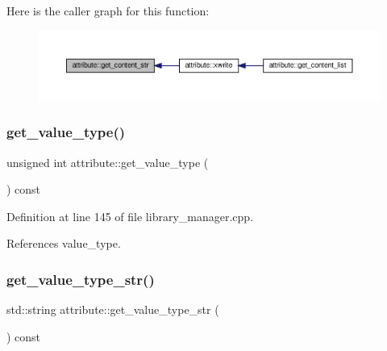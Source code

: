 Here is the caller graph for this function\+:
\nopagebreak
\begin{figure}[H]
\begin{center}
\leavevmode
\includegraphics[width=350pt]{d9/d18/structattribute_abe1be3f2ea1fea96b490e4e0d12da955_icgraph}
\end{center}
\end{figure}
\mbox{\label{structattribute_a82221bc27c1c3af4df3610f7b81307eb}} 
\subsubsection{\texorpdfstring{get\+\_\+value\+\_\+type()}{get\_value\_type()}}
{\footnotesize\ttfamily unsigned int attribute\+::get\+\_\+value\+\_\+type (\begin{DoxyParamCaption}{ }\end{DoxyParamCaption}) const}



Definition at line 145 of file library\+\_\+manager.\+cpp.



References value\+\_\+type.

\mbox{\label{structattribute_a6d201447a5f5565c639c328ef5ef7e5c}} 
\subsubsection{\texorpdfstring{get\+\_\+value\+\_\+type\+\_\+str()}{get\_value\_type\_str()}}
{\footnotesize\ttfamily std\+::string attribute\+::get\+\_\+value\+\_\+type\+\_\+str (\begin{DoxyParamCaption}{ }\end{DoxyParamCaption}) const}



